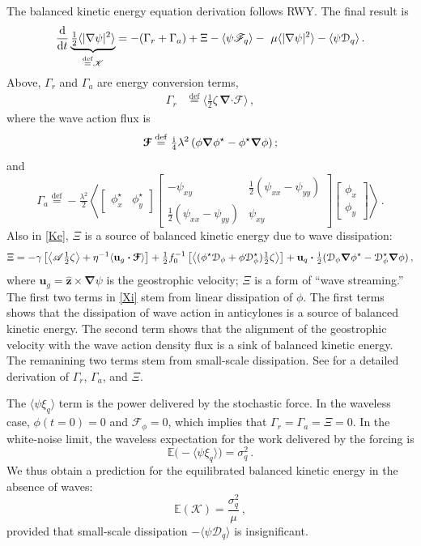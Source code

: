 \documentclass[12pt]{article}
\newcommand{\defn}{\ensuremath{\stackrel{\mathrm{def}}{=}}}
\newcommand{\per}{\, .}
\newcommand{\com}{\, ,}
\def\beq{\begin{equation}}
\def\eeq{\end{equation}}
\newcommand{\diver}{\boldsymbol{\nabla} \!\bcdot\!}
\providecommand\bcdot{\boldsymbol{\cdot}}
\newcommand{\half}{\tfrac{1}{2}}
\newcommand{\halfi}{\tfrac{\ii}{2}}
\newcommand{\phis}{\phi^\star}
\def\ii{{\rm i}}
\def\dd{{\rm d}}
\newcommand{\A}{\mathscr{A}}
\newcommand{\K}{\mathscr{K}}
\newcommand{\F}{{\mathscr{F}}}
\def\la{\langle}
\def\ra{\rangle}
\newcommand{\?}{\stackrel{?}{=}}
\newcommand{\cross}{\times}
\newcommand{\grad}{\boldsymbol{\nabla}}
\newcommand{\D}{\mathcal{D}}
\newcommand{\ze}{\zeta}
\newcommand{\Es}{\mathbb{E}}
\newcommand{\RWY}{RWY}
\newcommand{\Ff}{ \boldsymbol{\mathcal{F}}}
\begin{document}
The balanced kinetic energy equation derivation follows \RWY. The final result is
\beq
\frac{\dd}{\dd t} \underbrace{\half \la |\nabla \psi|^2 \ra}_{\defn \K} = -(\Gamma_r + \Gamma_a) + \Xi
 -\la \psi \F_q \ra -\ \mu \la|\nabla\psi|^2\ra - \la\psi\D_q\ra\per
\label{Ke}
\eeq
Above, $\Gamma_r$ and
$\Gamma_a$ are energy conversion terms,
\begin{align}
\Gamma_r &\defn  \Big\la\half\ze \, \diver\Ff \Big\ra\com \label{convr}
\end{align}
where the wave action flux is
\beq
\label{Fw2}
\Ff \defn \tfrac{\ii}{4}\lambda^2 \left(\phi\grad\phis-\phis\grad\phi\right);
\eeq
and
\beq
 \Gamma_a \defn -\tfrac{\lambda^2}{2}
   \left\la
   \begin{bmatrix}
   \phi_x^\star & \phi_y^\star
   \end{bmatrix}
   \begin{bmatrix}
   -\psi_{xy} & \half(\psi_{xx} - \psi_{yy})\\
   \half(\psi_{xx}-\psi_{yy}) & \psi_{xy}
\end{bmatrix}
 \begin{bmatrix}
   \phi_x \\  \phi_y
   \end{bmatrix}\right\ra\per
   \label{conva}
\eeq
 Also in \eqref{Ke}, $\Xi$ is a source of balanced kinetic energy
due to wave dissipation:
\beq
\label{Xi}
\Xi = -\gamma\left[\left\la\A \half\zeta\right\ra +
        \eta^{-1}\la\mathbf{u}_g\bcdot\Ff\ra\right]
    + \half f_0^{-1}\left[\left\la (\phis\D_\phi+\phi\D_\phis)\half\zeta\right\ra\right]
      + \mathbf{u}_q\bcdot\halfi (\D_\phi\grad\phis-\D_\phis\grad\phi)\com
\eeq
where $\mathbf{u}_g = \hat{\mathbf{z}}\cross\grad\psi$ is the geostrophic velocity;
$\Xi$ is a form of ``wave streaming.''
The first two terms in \eqref{Xi} stem from linear dissipation of $\phi$. The first
terms shows that the dissipation of wave action in anticylones is a source of balanced
kinetic energy. The second term shows that the alignment of the geostrophic velocity
with the wave action density flux is a sink of balanced kinetic energy. The
remanining two terms stem from small-scale dissipation.
See \cite{rocha_etal2017} for a detailed derivation of $\Gamma_r$, $\Gamma_a$, and $\Xi$.

The  $\la\psi\xi_q\ra$ term  is the power delivered by the stochastic force.
In the waveless case, $\phi(t=0)=0$ and $\F_\phi=0$,  which implies that
$\Gamma_r=\Gamma_a = \Xi = 0$. In the white-noise limit, the waveless expectation for
the work delivered by the forcing is
\beq
\Es\big(-\la\psi\xi_q\ra\big) = \sigma_q^2\per
\eeq
We thus obtain a prediction for the equilibrated balanced kinetic energy in the
absence of waves:
\beq
\label{predicted_K}
\Es(\K )= \frac{\sigma_q^2}{\mu}\com
\eeq
provided that small-scale dissipation $-\la\psi\D_q\ra$ is insignificant.
\end{document}
